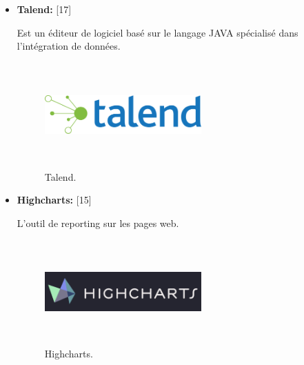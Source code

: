 \begin{itemize}
\item {  \textbf{ Talend:} } [17]


 Est un éditeur de logiciel basé sur le langage JAVA spécialisé dans l'intégration de données.


\begin{figure}[H]
\center
\includegraphics[width=6cm,height=4cm]{./figures/teklogos/talend.png}
\caption{Talend.}
\end{figure}


\item {  \textbf{ Highcharts:} } [15]


L'outil de \guillemotleft{} reporting \guillemotright{} sur les pages web.


\begin{figure}[H]
\center
\includegraphics[width=6cm,height=4cm]{./figures/teklogos/highcharts.png}
\caption{Highcharts.}
\end{figure}


\end{itemize}






















